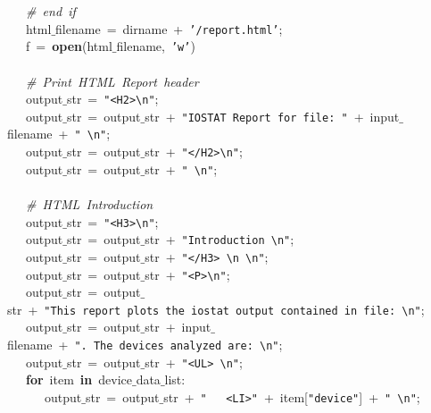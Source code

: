 \mbox{}\ \ \ \textit{\#\ end\ if} \\
\mbox{}\ \ \ html$\_$filename\ =\ dirname\ +\ \texttt{'/report.html'}; \\
\mbox{}\ \ \ f\ =\ \textbf{open}(html$\_$filename,\ \texttt{'w'}) \\
\mbox{}\ \ \  \\
\mbox{}\ \ \ \textit{\#\ Print\ HTML\ Report\ header} \\
\mbox{}\ \ \ output$\_$str\ =\ \texttt{"{}\textless{}H2\textgreater{}\textbackslash{}n"{}}; \\
\mbox{}\ \ \ output$\_$str\ =\ output$\_$str\ +\ \texttt{"{}IOSTAT\ Report\ for\ file:\ "{}}\ +\ input$\_$filename\ +\ \texttt{"{}\ \textbackslash{}n"{}}; \\
\mbox{}\ \ \ output$\_$str\ =\ output$\_$str\ +\ \texttt{"{}\textless{}/H2\textgreater{}\textbackslash{}n"{}}; \\
\mbox{}\ \ \ output$\_$str\ =\ output$\_$str\ +\ \texttt{"{}\ \textbackslash{}n"{}}; \\
\mbox{}\ \ \  \\
\mbox{}\ \ \ \textit{\#\ HTML\ Introduction} \\
\mbox{}\ \ \ output$\_$str\ =\ \texttt{"{}\textless{}H3\textgreater{}\textbackslash{}n"{}}; \\
\mbox{}\ \ \ output$\_$str\ =\ output$\_$str\ +\ \texttt{"{}Introduction\ \textbackslash{}n"{}}; \\
\mbox{}\ \ \ output$\_$str\ =\ output$\_$str\ +\ \texttt{"{}\textless{}/H3\textgreater{}\ \textbackslash{}n\ \textbackslash{}n"{}}; \\
\mbox{}\ \ \ output$\_$str\ =\ output$\_$str\ +\ \texttt{"{}\textless{}P\textgreater{}\textbackslash{}n"{}}; \\
\mbox{}\ \ \ output$\_$str\ =\ output$\_$str\ +\ \texttt{"{}This\ report\ plots\ the\ iostat\ output\ contained\ in\ file:\ \textbackslash{}n"{}}; \\
\mbox{}\ \ \ output$\_$str\ =\ output$\_$str\ +\ input$\_$filename\ +\ \texttt{"{}.\ The\ devices\ analyzed\ are:\ \textbackslash{}n"{}}; \\
\mbox{}\ \ \ output$\_$str\ =\ output$\_$str\ +\ \texttt{"{}\textless{}UL\textgreater{}\ \textbackslash{}n"{}}; \\
\mbox{}\ \ \ \textbf{for}\ item\ \textbf{in}\ device$\_$data$\_$list: \\
\mbox{}\ \ \ \ \ \ output$\_$str\ =\ output$\_$str\ +\ \texttt{"{}\ \ \ \textless{}LI\textgreater{}"{}}\ +\ item[\texttt{"{}device"{}}]\ +\ \texttt{"{}\ \textbackslash{}n"{}}; \\
